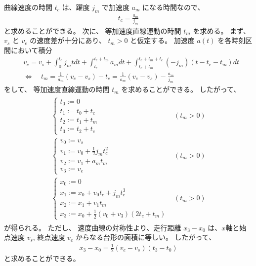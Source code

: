 \documentclass[a5paper]{ltjsarticle}
\begin{document}
曲線速度の時間 $t_c$ は、躍度 $j_m$ で加速度 $a_m$ になる時間なので、
\begin{align}
    t_c = \frac{a_m}{j_m}
\end{align}
と求めることができる。
次に、
等加速度直線運動の時間 $t_m$ を求める。
まず、
$v_s$ と $v_e$ の速度差が十分にあり、 $t_m>0$ と仮定する。
加速度 $a(t)$ を各時刻区間において積分
\begin{align}
     &
    v_e
    =
    v_s + \int_{0}^{t_c}j_m t dt + \int_{t_c}^{t_c+t_m} a_m dt + \int_{t_c+t_m}^{t_c+t_m+t_c} (-j_m)(t-t_c-t_m) dt
    \\
     &
    \Leftrightarrow\quad
    t_m = \frac{1}{a_m}(v_e-v_s) - t_c
    = \frac{1}{a_m}(v_e-v_s) - \frac{a_m}{j_m}
\end{align}
をして、
等加速度直線運動の時間 $t_m$ を求めることができる。
したがって、
\begin{align}
    \begin{array}{ll}
        \left\{ \begin{array}{l}
            t_0 := 0         \\
            t_1 := t_0 + t_c \\
            t_2 := t_1 + t_m \\
            t_3 := t_2 + t_c
        \end{array} \right.
         &
        (t_m > 0)
        \\
        \left\{ \begin{array}{l}
            v_0 := v_s                        \\
            v_1 := v_0 + \frac{1}{2}j_m t_c^2 \\
            v_2 := v_1 + a_m t_m              \\
            v_3 := v_e
        \end{array} \right.
         &
        (t_m > 0)
        \\
        \left\{ \begin{array}{l}
            x_0 := 0                         \\
            x_1 := x_0 + v_0 t_c + j_m t_c^3 \\
            x_2 := x_1 + v_1 t_m             \\
            x_3 := x_0 + \frac{1}{2} (v_0+v_3) (2t_c+t_m)
        \end{array} \right.
         &
        (t_m > 0)
    \end{array}
\end{align}
が得られる。
ただし、
速度曲線の対称性より、走行距離 $x_3-x_0$ は、$x$軸と始点速度 $v_s$, 終点速度 $v_e$ からなる台形の面積に等しい。
したがって、
\begin{align}
    x_3-x_0 = \frac{1}{2}\left( v_e-v_s \right) \left( t_3-t_0 \right)
\end{align}
と求めることができる。
\end{document}
